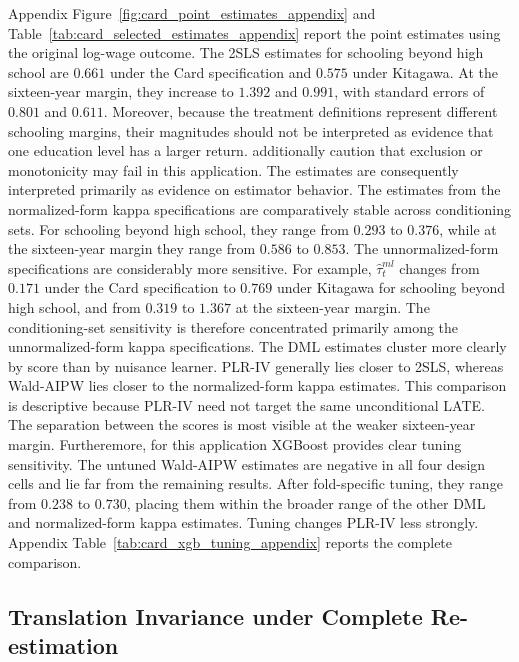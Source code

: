 \documentclass[12pt, a4paper, oneside]{article}
\theoremstyle{plain}
\theoremstyle{definition}
\begin{document}
Appendix Figure~\ref{fig:card_point_estimates_appendix} and Table~\ref{tab:card_selected_estimates_appendix} report the point estimates using the original log-wage outcome.
The 2SLS estimates for schooling beyond high school are \(0.661\) under the Card specification and \(0.575\) under Kitagawa. At the sixteen-year margin, they increase to \(1.392\) and \(0.991\), with standard errors of \(0.801\) and \(0.611\).
Moreover, because the treatment definitions represent different schooling margins, their magnitudes should not be interpreted as evidence that one education level has a larger return. \citet{sloczynski2025abadie} additionally caution that exclusion or monotonicity may fail in this application. The estimates are consequently interpreted primarily as evidence on estimator behavior.
The estimates from the normalized-form kappa specifications are comparatively stable across conditioning sets. For schooling beyond high school, they range from \(0.293\) to \(0.376\), while at the sixteen-year margin they range from \(0.586\) to \(0.853\). The unnormalized-form specifications are considerably more sensitive. For example, \(\widehat{\tau}^{ml}_{t}\) changes from \(0.171\) under the Card specification to \(0.769\) under Kitagawa for schooling beyond high school, and from \(0.319\) to \(1.367\) at the sixteen-year margin. The conditioning-set sensitivity is therefore concentrated primarily among the unnormalized-form kappa specifications.
The DML estimates cluster more clearly by score than by nuisance learner. PLR-IV generally lies closer to 2SLS, whereas Wald-AIPW lies closer to the normalized-form kappa estimates. This comparison is descriptive because PLR-IV need not target the same unconditional LATE. The separation between the scores is most visible at the weaker sixteen-year margin.
Furtheremore, for this application XGBoost provides clear  tuning sensitivity. The untuned Wald-AIPW estimates are negative in all four design cells and lie far from the remaining results. After fold-specific tuning, they range from \(0.238\) to \(0.730\), placing them within the broader range of the other DML and normalized-form kappa estimates. Tuning changes PLR-IV less strongly. Appendix Table~\ref{tab:card_xgb_tuning_appendix} reports the complete comparison.


\subsection{Translation Invariance under Complete Re-estimation}
\label{subsec:card_translation}
\end{document}
